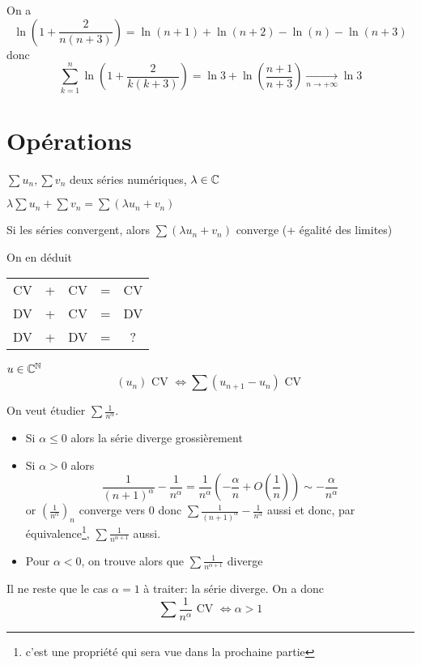 \begin{ex}
    On a \[
        \ln \left( 1+\frac2{n(n+3)} \right)=\ln(n+1)+\ln(n+2)-\ln(n)-\ln(n+3)
    \]
    donc \[
        \sum_{k=1}^n\ln \left( 1+\frac2{k(k+3)} \right) =\ln3+\ln \left( \frac{n+1}{n+3} \right)\xrightarrow[n\to+\infty]{}\ln 3
    \]
\end{ex}

\section{Opérations}

\begin{prop}
    \Hyp $\sum u_n, \sum v_n$ deux séries numériques, $\lambda\in\mathbb C$
    \begin{concenum}
    \item $\lambda\sum u_n+\sum v_n=\sum(\lambda u_n+v_n)$
    \item Si les séries convergent, alors $\sum(\lambda u_n+v_n)$ converge (+ égalité des limites)
    \end{concenum}
\end{prop}

\begin{rem}
    On en déduit
    \begin{center}
    \begin{tabular}{ccccc}
        CV & + & CV & = & CV\\
        DV & + & CV & = & DV\\
        DV & + & DV & = & ?
    \end{tabular}
    \end{center}
\end{rem}

\begin{prop}
    \Hyp $u\in\mathbb C^{\mathbb N}$
    \Conc \[
        (u_n)\text{ CV }\iff \sum (u_{n+1}-u_n)\text{ CV }
    \]
\end{prop}

\begin{ex}
    On veut étudier $\sum\frac1{n^\alpha}$.
    \begin{itemize}
        \item Si $\alpha\leq0$ alors la série diverge grossièrement
        \item Si $\alpha> 0$ alors \[
                \frac1{(n+1)^\alpha}-\frac1{n^\alpha}=\frac1{n^\alpha} \left( -\frac\alpha n+O \left( \frac1n \right) \right)\sim -\frac\alpha{n^\alpha}
            \]
            or $(\frac1{n^{\alpha}})_n$ converge vers $0$ donc $\sum \frac1{(n+1)^\alpha}-\frac1{n^\alpha}$ aussi et donc, par équivalence\footnote{c'est une propriété qui sera vue dans la prochaine partie}, $\sum\frac1{n^{\alpha+1}}$ aussi.

        \item Pour $\alpha<0$, on trouve alors que $\sum\frac1{n^{\alpha+1}}$ diverge
    \end{itemize}
    Il ne reste que le cas $\alpha=1$ à traiter: la série diverge. On a donc \[
    \sum\frac1{n^\alpha}\text{ CV }\iff \alpha>1
\]
\end{ex}

